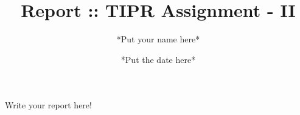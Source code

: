 \documentclass{article}
\title{Report :: TIPR Assignment - II}
\author{*Put your name here*}
\date{*Put the date here*}
\begin{document}
\maketitle

Write your report here!
\end{document}
